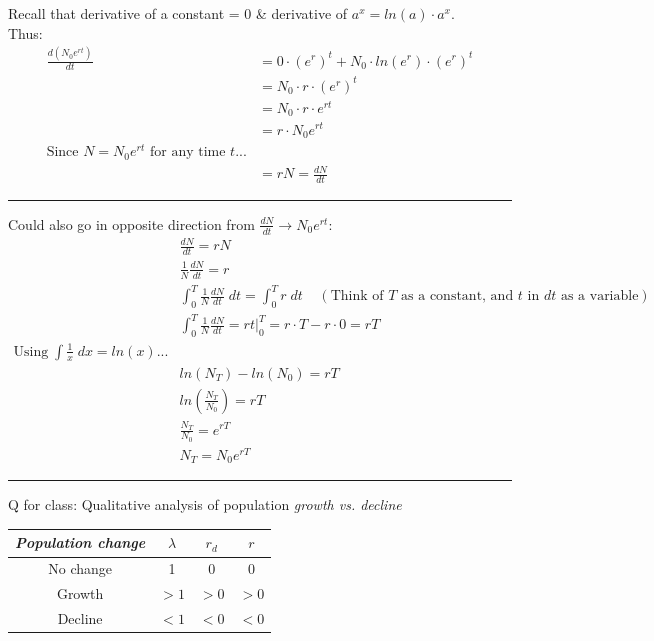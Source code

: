 \documentclass{article}
\newcommand*\circled[1]{\tikz[baseline=(char.base)]{
            \node[shape=circle,draw,inner sep=2pt] (char) {#1};}}
\begin{document}
Recall that derivative of a constant = 0  \& derivative of $a^x = ln(a)\cdot a^x$.\\
Thus:
\begin{align*}
	\frac{d(N_0 e ^{rt})}{dt} & =0 \cdot (e^r)^t + N_0 \cdot ln(e^r)\cdot (e^r)^t\\
	&=  N_0  \cdot r \cdot (e^r)^t \\
	&=  N_0 \cdot r \cdot e^{rt}\\
	&=   r \cdot N_0 e^{rt} \\
\text{Since } N=N_0 e^{rt} \text{ for any time } t ...&\\
	&=rN=\frac{dN}{dt}
\end{align*}

\rule[0.5ex]{\linewidth}{1pt}

\circled{4}
Could also go in opposite direction from $\frac{dN}{dt} \rightarrow N_0 e^{rt}$:
\begin{align*}
&	\frac{dN}{dt}=rN\\
&	\frac{1}{N}\frac{dN}{dt}=r\\
&	\int_0^T \frac{1}{N}\frac{dN}{dt} \; dt = \int_0^T r\; dt \;\;\;\;(\text{Think of }T \text{ as a constant, and }t\text{ in }dt\text{ as a variable})\\
&	\int_0^T \frac{1}{N}\frac{dN}{dt}  = r t \vert_0^T = r \cdot T - r \cdot 0 = r T\\
	\text{Using} \; \int \frac{1}{x}\; dx = ln(x)...\\
&	ln(N_T)-ln(N_0)=rT\\
& ln\left( \frac{N_T}{N_0}\right) = rT\\
& \frac{N_T}{N_0}= e^{rT}\\
& N_T=N_0e^{rT}
\end{align*}

\rule[0.5ex]{\linewidth}{1pt}

\break

Q for class: Qualitative analysis of population \emph{growth vs. decline}

\begin{center}
\begin{tabular}{|c|c|c|c|}
\hline \rule[-2ex]{0pt}{5.5ex} \emph{Population change} & $\lambda$ & $r_d$ &  $r$ \\ 
\hline \rule[-2ex]{0pt}{5.5ex} No change & 1 & 0 & 0 \\ 
\hline \rule[-2ex]{0pt}{5.5ex} Growth  & $>1$ & $>0$ & $>0$ \\ 
\hline \rule[-2ex]{0pt}{5.5ex} Decline & $<1$ & $<0$ & $<0$ \\ 
\hline 
\end{tabular}
\end{center} 
\end{document}

